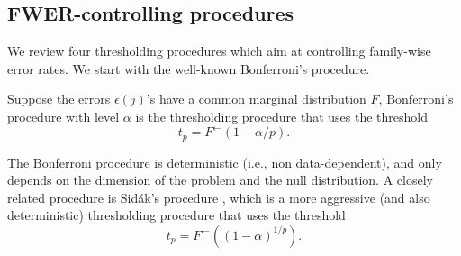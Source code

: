 \subsection{FWER-controlling procedures}
\label{subsec:FWER-controlling-procedures}

We review four thresholding procedures which aim at controlling family-wise error rates.
We start with the well-known Bonferroni's procedure.
\begin{definition}
Suppose the errors $\epsilon(j)$'s have a common marginal distribution $F$, Bonferroni's procedure with level $\alpha$ is the thresholding procedure that uses the threshold
\begin{equation} \label{eq:Bonferroni-procedure}
    t_p = F^{\leftarrow}(1 - \alpha/p).
\end{equation}
\end{definition}
The Bonferroni procedure is deterministic (i.e., non data-dependent), and only depends on the dimension of the problem and the null distribution.
A closely related procedure is Sid\'ak's procedure \citep{vsidak1967rectangular},
which is a more aggressive (and also deterministic) thresholding procedure that uses the 
threshold
\begin{equation} \label{eq:Sidak-procedure}
    t_p = F^{\leftarrow}((1 - \alpha)^{1/p}).
\end{equation}

